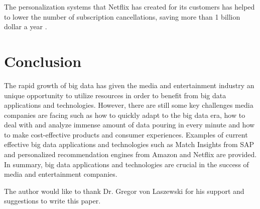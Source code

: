 The personalization systems that Netflix has created for its customers has helped to lower the number of subscription cancellations, saving more than 1 billion dollar a year \cite{Whitley2016data}.

\section{Conclusion}

The rapid growth of big data has given the media and entertainment industry an unique opportunity to utilize resources in order to benefit from big data applications and technologies. However, there are still some key challenges media companies are facing such as how to quickly adapt to the big data era, how to deal with and analyze immense amount of data pouring in every minute and how to make cost-effective products and consumer experiences. Examples of current effective big data applications and technologies such as Match Insights from SAP and personalized recommendation engines from Amazon and Netflix are provided. In summary, big data applications and technologies are crucial in the success of media and entertainment companies.

\begin{acks}

  The author would like to thank Dr. Gregor von Laszewski for his support and suggestions to write this paper.

\end{acks}


 
